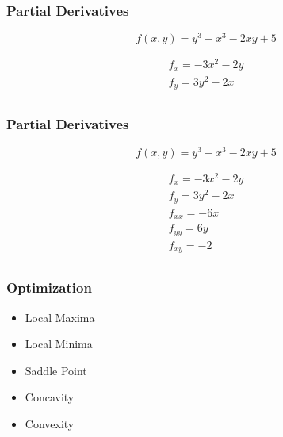 \documentclass{beamer}
\begin{document}
			\begin{frame}
		\frametitle{Partial Derivatives}
		
		\[ f(x,y) = y^3 - x^3 -2xy + 5\]
		
		\begin{eqnarray}
		f_x = -3x^2 -2y \\ \nonumber
		f_y = 3y^2 -2x \\ \nonumber
		\end{eqnarray}
		
			\end{frame}
			\begin{frame}
		\frametitle{Partial Derivatives}
		
		\[ f(x,y) = y^3 - x^3 -2xy +5\]
		
		\begin{eqnarray}
		f_x = -3x^2 -2y \\ \nonumber
		f_y = 3y^2 -2x \\ \nonumber
		f_{xx} = -6x \\ \nonumber
		f_{yy} = 6y \\ \nonumber
		f_{xy} =-2 \\ \nonumber
		\end{eqnarray}
		\end{frame}
		\begin{frame}
		\frametitle{Optimization}
		
		\begin{itemize}
			\item Local Maxima
			\item Local Minima
			\item Saddle Point
			\item Concavity
			\item Convexity
		\end{itemize}
		\end{frame}
	
\end{document}
